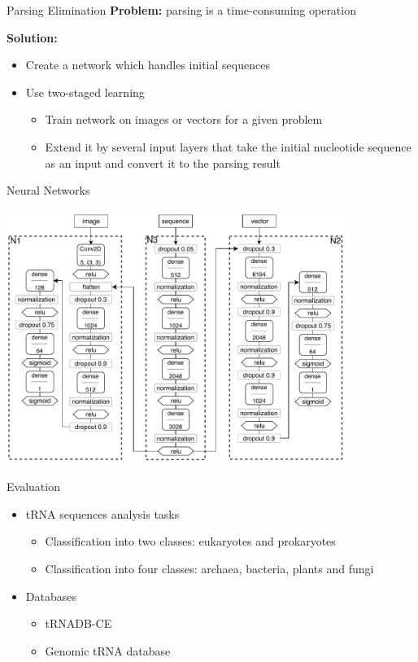 \documentclass[xcolor=table]{beamer}
\begin{document}
\begin{frame}{Parsing Elimination}
\textbf{Problem:} parsing is a time-consuming operation
\vspace{8pt}

\textbf{Solution:}
    \begin{itemize}
        \item Create a network which handles initial sequences
        \item Use two-staged learning
        \begin{itemize}
            \item Train network on images or vectors for a given problem
            \item Extend it by several input layers that take the initial nucleotide sequence as an input and convert it to the parsing result 
        \end{itemize}
    \end{itemize}
\end{frame}

\begin{frame}{Neural Networks}
\begin{center}
\vspace{-0.4cm}
\includegraphics[width=11cm]{pictures/nn_all.pdf}
\end{center}
\end{frame}


\begin{frame}{Evaluation}
\begin{itemize}
    \item tRNA sequences analysis tasks
    \begin{itemize}
        \item Classification into two classes: eukaryotes and prokaryotes
        \item Classification into four classes: archaea, bacteria, plants and fungi
    \end{itemize}
    \item Databases
    \begin{itemize}
        \item tRNADB-CE
        \item Genomic tRNA database
    \end{itemize}
\end{itemize}
\end{frame}
\end{document}
